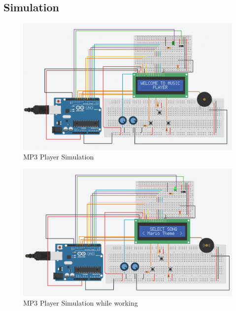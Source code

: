 \documentclass[11pt]{article}
\begin{document}
\subsection{Simulation}
\begin{figure}[H]
	\centering
	\includegraphics[scale=.45]{Circuit Diagram 1.png}
	\caption{MP3 Player Simulation}
	\label{fig:Circuit 1}
\end{figure}

\begin{figure}[H]
	\centering
	\includegraphics[scale=.40]{Circuit Diagram 2.png}
	\caption{MP3 Player Simulation while working}
	\label{fig:Circuit 2}
\end{figure}
\end{document}
